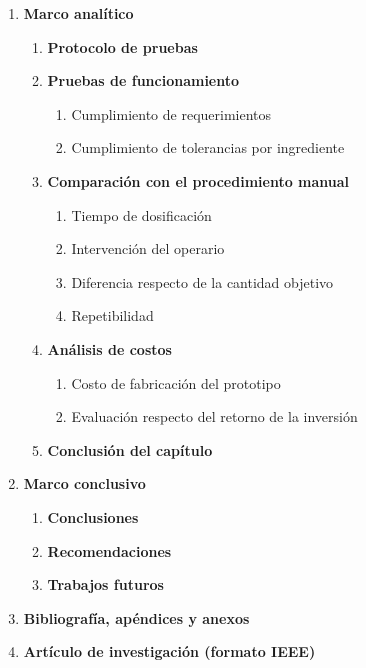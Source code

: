\begin{enumerate}[label*=\arabic*.]
\begin{enumerate}[label*=\arabic*.]
        \item \textbf{Conclusión del capítulo}
    \end{enumerate}

    \item \textbf{Marco analítico}
    \begin{enumerate}[label*=\arabic*.]
        \item \textbf{Protocolo de pruebas}

        \item \textbf{Pruebas de funcionamiento}
        \begin{enumerate}[label*=\arabic*.]
            \item Cumplimiento de requerimientos
            \item Cumplimiento de tolerancias por ingrediente
        \end{enumerate}

        \item \textbf{Comparación con el procedimiento manual}
        \begin{enumerate}[label*=\arabic*.]
            \item Tiempo de dosificación
            \item Intervención del operario
            \item Diferencia respecto de la cantidad objetivo
            \item Repetibilidad
        \end{enumerate}

        \item \textbf{Análisis de costos}
        \begin{enumerate}[label*=\arabic*.]
            \item Costo de fabricación del prototipo
            \item Evaluación respecto del retorno de la inversión
        \end{enumerate}

        \item \textbf{Conclusión del capítulo}
    \end{enumerate}

    \item \textbf{Marco conclusivo}
    \begin{enumerate}[label*=\arabic*.]
        \item \textbf{Conclusiones}
        \item \textbf{Recomendaciones}
        \item \textbf{Trabajos futuros}
    \end{enumerate}

    \item \textbf{Bibliografía, apéndices y anexos}

    \item \textbf{Artículo de investigación (formato IEEE)}

\end{enumerate}

